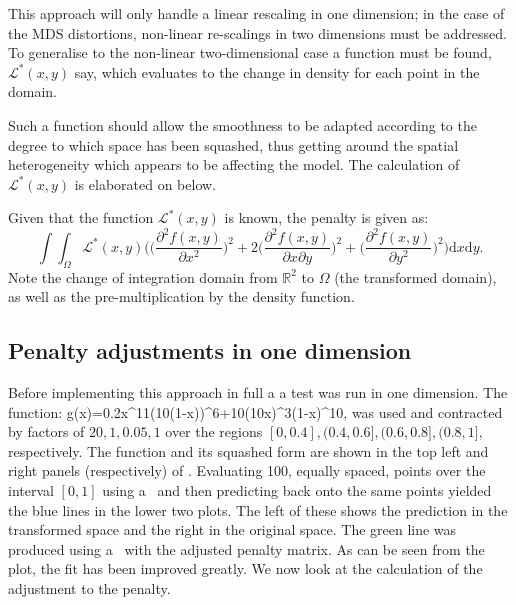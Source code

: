 {This approach will only handle a linear rescaling in one dimension; in the case of the MDS distortions, non-linear re-scalings in two dimensions must be addressed. To generalise  to the non-linear two-dimensional case a function must be found, $\mathcal{L}^*(x,y)$ say, which evaluates to the change in density for each point in the domain. 

Such a function should allow the smoothness to be adapted according to the degree to which space has been squashed, thus getting around the spatial heterogeneity which appears to be affecting the model. The calculation of $\mathcal{L}^*(x,y)$ is elaborated on below.

Given that the function $\mathcal{L}^*(x,y)$ is known, the penalty is given as:
\begin{equation}
\int\int_\Omega \mathcal{L}^*(x,y) \Big( \Big(\frac{\partial^2 f(x,y)}{\partial x^2}\Big)^2 + 2\Big(\frac{\partial^2 f(x,y)}{\partial x \partial y}\Big)^2 + \Big(\frac{\partial^2 f(x,y)}{\partial y^2}\Big)^2\Big) \text{d}x\text{d}y.
\label{kdeadjust}
\end{equation}
Note the change of integration domain from $\mathbb{R}^2$ to $\Omega$ (the transformed domain), as well as the pre-multiplication by the density function.

\subsection{Penalty adjustments in one dimension}

Before implementing this approach in full a a test was run in one dimension. The function:
\be
g(x)=0.2x^{11}(10(1-x))^6+10(10x)^3(1-x)^{10},
\label{hardfcn}
\ee
was used and contracted by factors of $20,1,0.05,1$ over the regions $[0,0.4], (0.4,0.6],(0.6,0.8],(0.8,1]$, respectively. The function and its squashed form are shown in the top left and right panels (respectively) of . Evaluating 100, equally spaced, points over the interval $[0,1]$ using a \tprs\ and then predicting back onto the same points yielded the blue lines in the lower two plots. The left of these shows the prediction in the transformed space and the right in the original space. The green line was produced using a \tprs\ with the adjusted penalty matrix. As can be seen from the plot, the fit has been improved greatly. We now look at the calculation of the adjustment to the penalty.

}
